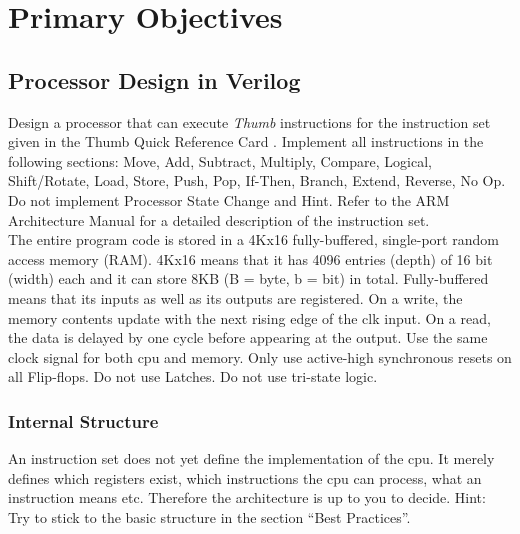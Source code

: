 \section{Primary Objectives}

\subsection{Processor Design in Verilog}
Design a processor that can execute \textit{Thumb} instructions
 for the instruction set given in the Thumb Quick Reference Card \cite{QRC}. Implement all instructions in the following sections: Move, Add, Subtract, Multiply, Compare, Logical, Shift/Rotate, Load, Store, Push, Pop, If-Then, Branch, Extend, Reverse, No Op. Do not implement Processor State Change and Hint. Refer to the ARM Architecture Manual \cite{ARMARM} for a detailed description of the instruction set. \\

The entire program code is stored in a 4Kx16 fully-buffered, single-port random access memory (RAM). 4Kx16 means that it has 4096 entries (depth) of 16 bit (width) each and it can store 8KB (B = byte, b = bit) in total. Fully-buffered means that its inputs as well as its outputs are registered. On a write, the memory contents update with the next rising edge of the clk input. On a read, the data is delayed by one cycle before appearing at the output.
Use the same clock signal for both cpu and memory. Only use active-high synchronous resets on all Flip-flops. Do not use Latches. Do not use tri-state logic.

\subsubsection*{Internal Structure}
An instruction set does not yet define the implementation of the cpu. It merely defines which registers exist, which instructions the cpu can process, what an instruction means etc. Therefore the architecture is up to you to decide.
Hint: Try to stick to the basic structure in the section ``Best Practices''.

